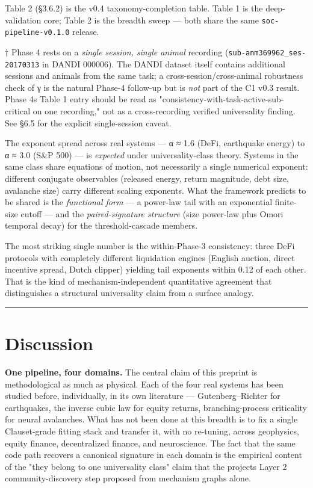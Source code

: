 \documentclass[
  11pt]{article}
\begin{document}
Table 2 (§3.6.2) is the v0.4 taxonomy-completion table. Table 1 is the
deep-validation core; Table 2 is the breadth sweep --- both share the
same \texttt{soc-pipeline-v0.1.0} release.

† Phase 4 rests on a \emph{single session, single animal} recording
(\texttt{sub-anm369962\_ses-20170313} in DANDI 000006). The DANDI
dataset itself contains additional sessions and animals from the same
task; a cross-session/cross-animal robustness check of γ is the natural
Phase-4 follow-up but is \emph{not} part of the C1 v0.3 result. Phase
4\textquotesingle s Table 1 entry should be read as
"consistency-with-task-active-sub-critical on one recording," not as a
cross-recording verified universality finding. See §6.5 for the explicit
single-session caveat.

The exponent spread across real systems --- α ≈ 1.6 (DeFi, earthquake
energy) to α ≈ 3.0 (S\&P 500) --- is \emph{expected} under
universality-class theory. Systems in the same class share equations of
motion, not necessarily a single numerical exponent: different conjugate
observables (released energy, return magnitude, debt size, avalanche
size) carry different scaling exponents. What the framework predicts to
be shared is the \emph{functional form} --- a power-law tail with an
exponential finite-size cutoff --- and the \emph{paired-signature
structure} (size power-law plus Omori temporal decay) for the
threshold-cascade members.

The most striking single number is the within-Phase-3 consistency: three
DeFi protocols with completely different liquidation engines (English
auction, direct incentive spread, Dutch clipper) yielding tail exponents
within 0.12 of each other. That is the kind of mechanism-independent
quantitative agreement that distinguishes a structural universality
claim from a surface analogy.

\begin{center}\rule{0.5\linewidth}{0.5pt}\end{center}

\section{Discussion}\label{sec:5}

\textbf{One pipeline, four domains.} The central claim of this preprint
is methodological as much as physical. Each of the four real systems has
been studied before, individually, in its own literature ---
Gutenberg--Richter for earthquakes, the inverse cubic law for equity
returns, branching-process criticality for neural avalanches. What has
not been done at this breadth is to fix a single Clauset-grade fitting
stack and transfer it, with no re-tuning, across geophysics, equity
finance, decentralized finance, and neuroscience. The fact that the same
code path recovers a canonical signature in each domain is the empirical
content of the "they belong to one universality class" claim that the
project\textquotesingle s Layer 2 community-discovery step proposed from
mechanism graphs alone.
\end{document}

